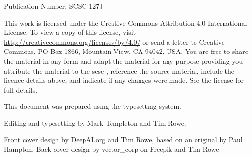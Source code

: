 %
%

%
%

\pagestyle{FirstPageFrontCover}
%
%



 Publication Number: SCSC-127J

This work is licensed under the Creative Commons Attribution 4.0 International License. To view a copy of this license, visit \href{http://creativecommons.org/licenses/by/4.0/}{http://creativecommons.org/licenses/by/4.0/} or send a letter to Creative Commons, PO Box 1866, Mountain View, CA 94042, USA\@. You are free to share the material in any form and adapt the material for any purpose providing you attribute the material to the \gls{scsc} , reference the source material, include the licence details above, and indicate if any changes were made.  See the license for full details.

This document was prepared using the \LaTeXe\/ typesetting system.

Editing and typesetting by Mark Templeton and Tim Rowe.

Front cover design by DeepAI.org and Tim Rowe, based on an original by Paul Hampton.
Back cover design by vector\_corp on Freepik and Tim Rowe


